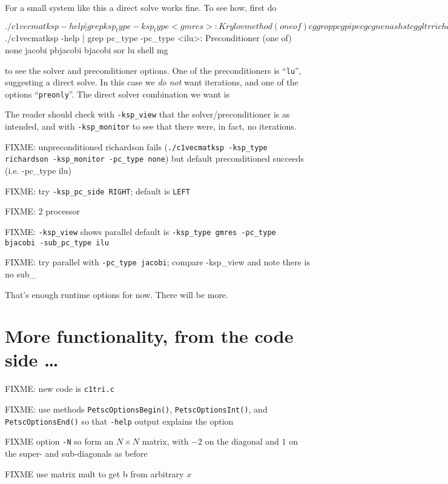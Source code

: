 For a small system like this a direct solve works fine.  To see how, first do
\begin{cline}
$ ./c1vecmatksp -help | grep ksp_type
  -ksp_type <gmres>: Krylov method (one of) cg groppcg pipecg cgne nash stcg gltr richardson
$ ./c1vecmatksp -help | grep pc_type
  -pc_type <ilu>: Preconditioner (one of) none jacobi pbjacobi bjacobi sor lu shell mg
\end{cline}
to see the solver and preconditioner options.  One of the preconditioners is ``\texttt{lu}'', suggesting a direct solve.  In this case we \emph{do not} want iterations, and one of the \pKSP options ``\texttt{preonly}''.  The direct solver combination we want is
The reader should check with \texttt{-ksp\_view} that the solver/preconditioner is as intended, and with \texttt{-ksp\_monitor} to see that there were, in fact, no iterations.

FIXME: unpreconditioned richardson fails (\texttt{./c1vecmatksp -ksp\_type richardson -ksp\_monitor -pc\_type none}) but default preconditioned succeeds (i.e. -pc\_type ilu)

FIXME: try \texttt{-ksp\_pc\_side RIGHT}; default is \texttt{LEFT}


FIXME: 2 processor

FIXME: \texttt{-ksp\_view} shows parallel default is \texttt{-ksp\_type gmres -pc\_type bjacobi -sub\_pc\_type ilu}


FIXME: try parallel with \texttt{-pc\_type jacobi}; compare -ksp\_view and note there is no sub\_


That's enough runtime options for now.  There will be more.

\section{More \PETSc functionality, from the code side \dots}

FIXME: new code is \texttt{c1tri.c}

FIXME: use methods \texttt{PetscOptionsBegin()}, \texttt{PetscOptionsInt()}, and \texttt{PetscOptionsEnd()} so that \texttt{-help} output explains the option

FIXME option \texttt{-N} so form an $N\times N$ matrix, with $-2$ on the diagonal and $1$ on the super- and sub-diagonals as before

FIXME use matrix mult to get b from arbitrary $x$

